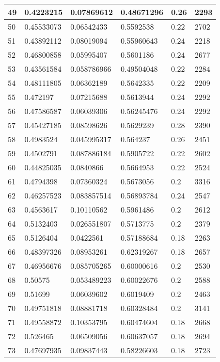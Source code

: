 \begin{longtable}{|l|l|l|l|l|l|}
49 & 0.4223215 & 0.07869612 & 0.48671296 & 0.26 & 2293 \\ \hline 
50 & 0.45533073 & 0.06542433 & 0.5592538 & 0.22 & 2702 \\ \hline 
51 & 0.43892112 & 0.08019094 & 0.55960643 & 0.24 & 2218 \\ \hline 
52 & 0.46800858 & 0.05995407 & 0.5601186 & 0.24 & 2677 \\ \hline 
53 & 0.43561584 & 0.058786966 & 0.49504048 & 0.22 & 2284 \\ \hline 
54 & 0.48111805 & 0.06362189 & 0.5642335 & 0.22 & 2209 \\ \hline 
55 & 0.472197 & 0.07215688 & 0.5613944 & 0.24 & 2292 \\ \hline 
56 & 0.47586587 & 0.06039306 & 0.56245476 & 0.24 & 2292 \\ \hline 
57 & 0.45427185 & 0.08598626 & 0.5629239 & 0.28 & 2390 \\ \hline 
58 & 0.4983524 & 0.045995317 & 0.564237 & 0.26 & 2451 \\ \hline 
59 & 0.4502791 & 0.087886184 & 0.5905722 & 0.22 & 2602 \\ \hline 
60 & 0.44825035 & 0.0840866 & 0.5664953 & 0.22 & 2524 \\ \hline 
61 & 0.4794398 & 0.07360324 & 0.5673056 & 0.2 & 3316 \\ \hline 
62 & 0.46257523 & 0.083857514 & 0.56893784 & 0.24 & 2547 \\ \hline 
63 & 0.4563617 & 0.10110562 & 0.5961486 & 0.2 & 2612 \\ \hline 
64 & 0.5132403 & 0.026551807 & 0.5713775 & 0.2 & 2379 \\ \hline 
65 & 0.5126404 & 0.0422561 & 0.57188684 & 0.18 & 2263 \\ \hline 
66 & 0.48397326 & 0.08953261 & 0.62319267 & 0.18 & 2657 \\ \hline 
67 & 0.46956676 & 0.085705265 & 0.60000616 & 0.2 & 2530 \\ \hline 
68 & 0.50575 & 0.053489223 & 0.60022676 & 0.2 & 2588 \\ \hline 
69 & 0.51699 & 0.06039602 & 0.6019409 & 0.2 & 2463 \\ \hline 
70 & 0.49751818 & 0.08881718 & 0.60328484 & 0.2 & 3141 \\ \hline 
71 & 0.49558872 & 0.10353795 & 0.60474604 & 0.18 & 2668 \\ \hline 
72 & 0.526465 & 0.06509056 & 0.60637057 & 0.18 & 2694 \\ \hline 
73 & 0.47697935 & 0.09837443 & 0.58226603 & 0.18 & 2723 \\ \hline 

\end{longtable}
